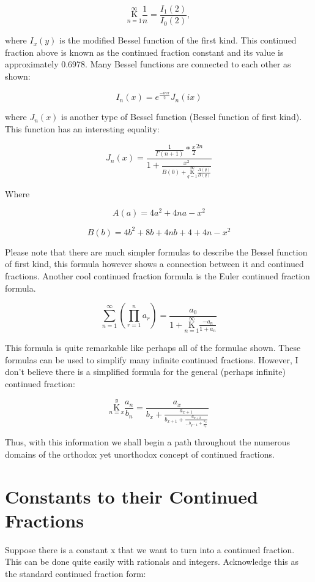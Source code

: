 \documentclass{article}
\begin{document}
$$ \underset{n=1}{\overset{\infty}{ \mathrm K}} \frac{1}{n} = \frac{I_1(2)}{I_0(2)},$$

where $I_x(y)$ is the modified Bessel function of the first kind. This continued fraction above is known as the continued fraction constant and its value is approximately 0.6978. Many Bessel functions are connected to each other as shown:

$$I_n(x)=e^\frac{-i n \pi}{2} J_n(ix)$$

where $J_n(x)$ is another type of Bessel function (Bessel function of first kind). This function has an interesting equality:

$$J_n(x)=\frac{\frac{1}{\Gamma(n+1)}*\frac{x}{2}^{2n}}{1+\frac{x^2}{B(0)+ \underset{q=1}{\overset{\infty}{ \mathrm K}} \frac{A(q)}{B(q)}}}$$

Where

$$ A(a) = 4a^2 + 4na - x^2$$

$$ B(b) = 4b^2 + 8b + 4nb + 4 + 4n - x^2$$

Please note that there are much simpler formulas to describe the Bessel function of first kind, this formula however shows a connection between it and continued fractions. Another cool continued fraction formula is the Euler continued fraction formula.

$$ \underset{n=1}{ \overset{\infty}{\sum}} (\underset{r=1}{ \overset{n}{\prod}} a_r) = \frac{a_0}{1+ \underset{n=1}{\overset{\infty}{ \mathrm K}} \frac{-a_n}{1+a_n}}$$

This formula is quite remarkable like perhaps all of the formulae shown. These formulas can be used to simplify many infinite continued fractions. However, I don’t believe there is a simplified formula for the general (perhaps infinite) continued fraction:

$$ \underset{n=x}{\overset{y}{ \mathrm K}} \frac{a_n}{b_n} = \frac{a_x}{b_x + \frac{a_{x+1}}{b_{x+1} + \frac{a_{x+2}}{... b_{y-1} + \frac{a_y}{b_y}}}}  $$

Thus, with this information we shall begin a path throughout the numerous domains of the orthodox yet unorthodox concept of continued fractions.

\section{Constants to their Continued Fractions}

Suppose there is a constant x that we want to turn into a continued fraction. This can be done quite easily with rationals and integers.
Acknowledge this as the standard continued fraction form:
\end{document}
